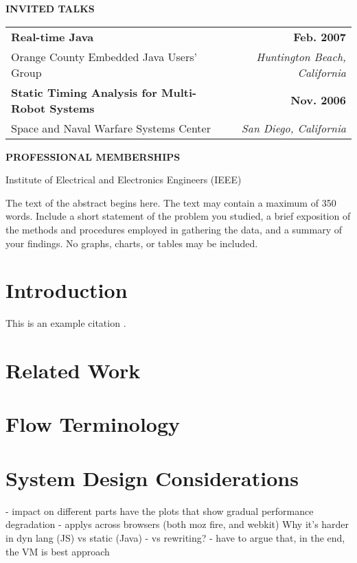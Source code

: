 \documentclass[12pt,fleqn]{ucithesis}
\begin{document}
{	\vspace{12pt}
	\textbf{INVITED TALKS}

	\begin{tabular*}{1\textwidth}{@{\extracolsep{\fill}}lr}
		\textbf{Real-time Java} & \textbf{Feb. 2007} \\
		\vspace{6pt}
		Orange County Embedded Java Users' Group & \emph{Huntington Beach, California} \\
		\textbf{Static Timing Analysis for Multi-Robot Systems} & \textbf{Nov. 2006} \\
		Space and Naval Warfare Systems Center & \emph{San Diego, California} \\
	\end{tabular*}

	\vspace{12pt}
	\textbf{PROFESSIONAL MEMBERSHIPS}

	Institute of Electrical and Electronics Engineers (IEEE)
}

\thesisabstract
{
	The text of the abstract begins here. The text may contain a maximum of 350 words. Include a short statement of the 
problem you studied, a brief exposition of the methods and procedures employed in gathering the data, and a summary of your 
findings. No graphs, charts, or tables may be included.
}

\preliminarypages

\chapter{Introduction}
This is an example citation \cite{Harmon2007}.
\chapter{Related Work}
\chapter{Flow Terminology}
\chapter{System Design Considerations}
  - impact on different parts
    have the plots that show gradual performance degradation
  - applys across browsers (both moz fire, and webkit)
Why it's harder in dyn lang (JS) vs static (Java)
 - vs rewriting?
 - have to argue that, in the end, the VM is best approach
\end{document}
